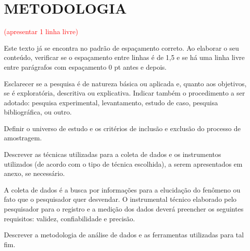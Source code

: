 \section{METODOLOGIA}
\textcolor{red}{(apresentar 1 linha livre)}

Este texto já se encontra no padrão de espaçamento correto. Ao elaborar o seu conteúdo, verificar se o espaçamento entre linhas é de 1,5 e se há uma linha livre entre parágrafos com espaçamento 0 pt antes e depois. 
\cite{reforma}

Esclarecer se a pesquisa é de natureza básica ou aplicada e, quanto aos objetivos, se é exploratória, descritiva ou explicativa. Indicar também o procedimento a ser adotado: pesquisa experimental, levantamento, estudo de caso, pesquisa bibliográfica, ou outro. 

Definir o universo de estudo e os critérios de inclusão e exclusão do processo de amostragem. 

Descrever as técnicas utilizadas para a coleta de dados e os instrumentos utilizados (de acordo com o tipo de técnica escolhida), a serem apresentados em anexo, se necessário. 

A coleta de dados é a busca por informações para a elucidação do fenômeno ou fato que o pesquisador quer desvendar. O instrumental técnico elaborado pelo pesquisador para o registro e a medição dos dados deverá preencher os seguintes requisitos: validez, confiabilidade e precisão.  

Descrever a metodologia de análise de dados e as ferramentas utilizadas para tal fim. 
